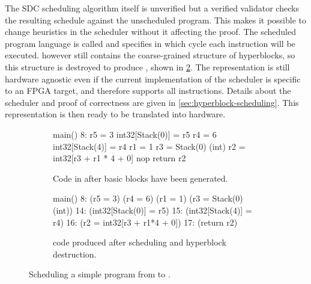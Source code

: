 The \gls{SDC} scheduling algorithm itself is unverified but a verified validator
checks the resulting schedule against the unscheduled program.  This makes it
possible to change heuristics in the scheduler without it affecting the proof.
The scheduled program language is called \rtlpar{} and specifies in which cycle
each instruction will be executed.  \rtlpar{} however still contains the
coarse-grained structure of hyperblocks, so this structure is destroyed to
produce \rtlsubpar{}, shown in \cref{fig:accumulator_par}.  The representation
is still hardware agnostic even if the current implementation of the scheduler
is specific to an \gls{FPGA} target, and therefore supports all \rtl{}
instructions.  Details about the scheduler and proof of correctness are given in
\cref{sec:hyperblock-scheduling}.  This representation is then ready to be
translated into hardware.

\begin{figure}
  \centering
    \begin{subfigure}[b]{0.48\linewidth}
\lstset{numbers=left,basicstyle=\footnotesize\ttfamily,numberstyle=\tiny,keepspaces=true,showspaces=true,xleftmargin=20pt}
\begin{rtllisting}
main() {
  8: {
    r5 = 3
    int32[Stack(0)] = r5
    r4 = 6
    int32[Stack(4)] = r4
    r1 = 1
    r3 = Stack(0) (int)
    r2 = int32[r3 + r1 * 4 + 0]
    nop
    return r2
  }
}
\end{rtllisting}
      \caption{Code in \rtlblock{} after basic blocks have been generated.}\label{fig:accumulator_seq}
    \end{subfigure}\hfill%
    \begin{subfigure}[b]{0.48\linewidth}
\lstset{numbers=left,basicstyle=\footnotesize\ttfamily,numberstyle=\tiny,keepspaces=true,showspaces=true,xleftmargin=20pt}
\begin{rtllisting}
main() {
  8: {
    (r5 = 3)
    (r4 = 6)
    (r1 = 1)
    (r3 = Stack(0) (int))
  }
  14: {(int32[Stack(0)] = r5)}
  15: {(int32[Stack(4)] = r4)}
  16: {(r2 = int32[r3 + r1*4 + 0])}
  17: {(return r2)}
}
\end{rtllisting}
      \caption{\rtlsubpar{} code produced after scheduling and hyperblock destruction.}\label{fig:accumulator_par}
    \end{subfigure}
    \caption{Scheduling a simple program from \rtlblock{} to
      \rtlpar{}.}\label{fig:accumulator_gblseqpar}
\end{figure}

